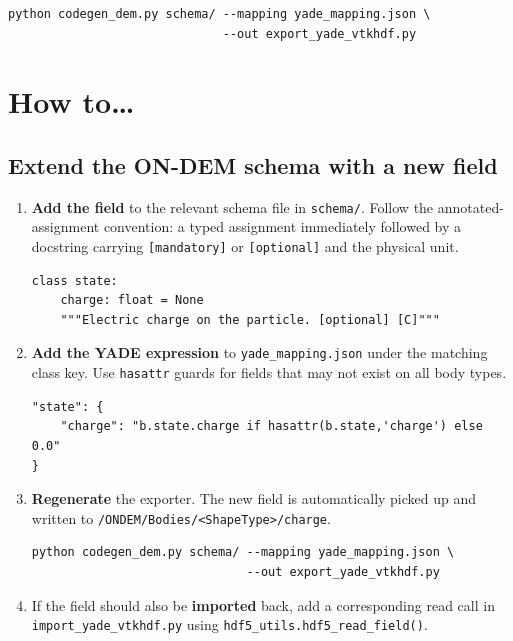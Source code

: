\documentclass[10pt,a4paper]{article}
\begin{document}
\begin{lstlisting}[style=sh]
python codegen_dem.py schema/ --mapping yade_mapping.json \
                              --out export_yade_vtkhdf.py
\end{lstlisting}

\section{How to\ldots}

\subsection{Extend the ON-DEM schema with a new field}

\begin{enumerate}[leftmargin=1.6em, itemsep=2pt, topsep=2pt]
  \item \textbf{Add the field} to the relevant schema file in \texttt{schema/}.
    Follow the annotated-assignment convention: a typed assignment immediately
    followed by a docstring carrying \texttt{[mandatory]} or \texttt{[optional]}
    and the physical unit.
\begin{lstlisting}[style=py]
class state:
    charge: float = None
    """Electric charge on the particle. [optional] [C]"""
\end{lstlisting}

  \item \textbf{Add the YADE expression} to \texttt{yade\_mapping.json} under
    the matching class key. Use \texttt{hasattr} guards for fields that may not
    exist on all body types.
\begin{lstlisting}[style=py, language={}]
"state": {
    "charge": "b.state.charge if hasattr(b.state,'charge') else 0.0"
}
\end{lstlisting}

  \item \textbf{Regenerate} the exporter. The new field is automatically picked
    up and written to \texttt{/ONDEM/Bodies/<ShapeType>/charge}.
\begin{lstlisting}[style=sh]
python codegen_dem.py schema/ --mapping yade_mapping.json \
                              --out export_yade_vtkhdf.py
\end{lstlisting}

  \item If the field should also be \textbf{imported} back, add a corresponding
    read call in \texttt{import\_yade\_vtkhdf.py} using
    \texttt{hdf5\_utils.hdf5\_read\_field()}.
\end{enumerate}
\end{document}
